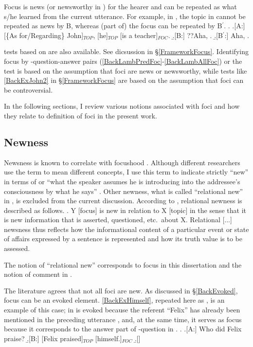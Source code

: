 Focus is news (or newsworthy in ) for the hearer and can be repeated as what s/he learned from the current utterance.
For example, in \Next,
the topic  in \Next[A] cannot be repeated as news by B,
whereas (part of) the focus  can be repeated by B$^{\prime}$.
%
\ex. \a.[A:] [\{As for/Regarding\} John]$_{TOP}$, [he]$_{TOP}$ [is a teacher]$_{FOC}$.
     \b.[B:] ??Aha, .
     \b.[B$^{\prime}$:] Aha, .

 tests based on  are also available.
See dicsussion in \S \ref{FrameworkFocus}.
Identifying focus by
-question-answer pairs (\ref{BackLambPredFoc}-\ref{BackLambAllFoc}) or the  test \Last
is based on the assumption that
foci are news or newsworthy,
while  tests like \ref{BackExJohn2} in \S \ref{FrameworkFocus} are based on the assumption that
foci can be controversial.

In the following sections,
I review various notions associated with foci
and how they relate to definition of foci in the present work.

\subsection{Newness}

Newsness is known to correlate with focushood \cite[]{li76,givon83,halliday04}.
Although different researchers use the term  to mean different concepts,
I use this term to indicate strictly ``new'' in terms of  or ``what the speaker assumes he is introducing into the addressee's consciousness by what he says'' \cite[p.~30]{chafe76}.
Other newness, what is called ``relational new'' in ,
is excluded from the current discussion.
According to , relational newness is described as follows.
%
\ex. Y [focus] is new in relation to X [topic] in the sense that
     it is new information that is asserted, questioned, etc.~about X.
     Relational [...] newsness thus reflects how the informational content of a particular event or state of affairs expressed by a sentence is represented and how its truth value is to be assessed.

The notion of ``relational new'' corresponds to focus in this dissertation and the notion of comment in .


The literature agrees that
not all foci are new.
As discussed in \S \ref{BackEvoked},
focus can be an evoked element.
\ref{BackExHimself}, repeated here as \Next,
is an example of this case;
 in \Next[B] is evoked because the referent ``Felix'' has already been mentioned in the preceding utterance \Next[A],
and, at the same time, it serves as focus because it corresponds to the answer part of -question in \Next[A].
%
\ex. \a.[A:] Who did Felix praise?
     \b.[B:] [Felix praised]$_{TOP}$ [himself.]$_{FOC}$
     \b.[] \hfill{\cite[p.~72, style modified by the current author]{reinhart81}}


